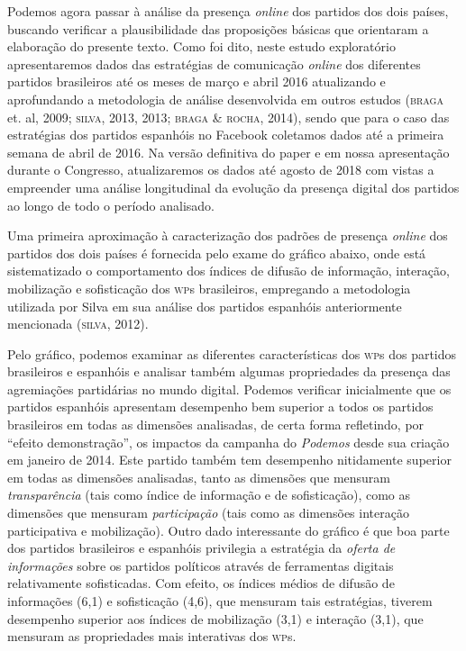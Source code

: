 Podemos agora passar à análise da presença \emph{online} dos partidos dos dois
países, buscando verificar a plausibilidade das proposições básicas que
orientaram a elaboração do presente texto. Como foi dito, neste estudo
exploratório apresentaremos dados das estratégias de comunicação \emph{online}
dos diferentes partidos brasileiros até os meses de março e abril 2016
atualizando e aprofundando a metodologia de análise desenvolvida em
outros estudos (\textsc{braga} et. al, 2009; \textsc{silva}, 2013, 2013; \textsc{braga \& rocha},
2014), sendo que para o caso das estratégias dos partidos espanhóis no
Facebook coletamos dados até a primeira semana de abril de 2016. Na
versão definitiva do paper e em nossa apresentação durante o Congresso,
atualizaremos os dados até agosto de 2018 com vistas a empreender uma
análise longitudinal da evolução da presença digital dos partidos ao
longo de todo o período analisado.

Uma primeira aproximação à caracterização dos padrões de presença \emph{online}
dos partidos dos dois países é fornecida pelo exame do gráfico abaixo,
onde está sistematizado o comportamento dos índices de difusão de
informação, interação, mobilização e sofisticação dos \textsc{wp}s brasileiros,
empregando a metodologia utilizada por Silva em sua análise dos partidos
espanhóis anteriormente mencionada (\textsc{silva}, 2012).

\pagebreak

\begin{center}
\end{center}


Pelo gráfico, podemos examinar as diferentes características dos \textsc{wp}s dos
partidos brasileiros e espanhóis e analisar também algumas propriedades
da presença das agremiações partidárias no mundo digital. Podemos
verificar inicialmente que os partidos espanhóis apresentam desempenho
bem superior a todos os partidos brasileiros em todas as dimensões
analisadas, de certa forma refletindo, por ``efeito demonstração'', os
impactos da campanha do \emph{Podemos} desde sua criação em janeiro de
2014. Este partido também tem desempenho nitidamente superior em todas
as dimensões analisadas, tanto as dimensões que mensuram
\emph{transparência} (tais como índice de informação e de sofisticação),
como as dimensões que mensuram \emph{participação} (tais como as
dimensões interação participativa e mobilização). Outro dado
interessante do gráfico é que boa parte dos partidos brasileiros e
espanhóis privilegia a estratégia da \emph{oferta de informações} sobre
os partidos políticos através de ferramentas digitais relativamente
sofisticadas. Com efeito, os índices médios de difusão de informações
(6,1) e sofisticação (4,6), que mensuram tais estratégias, tiverem
desempenho superior aos índices de mobilização (3,1) e interação (3,1),
que mensuram as propriedades mais interativas dos \textsc{wp}s.

